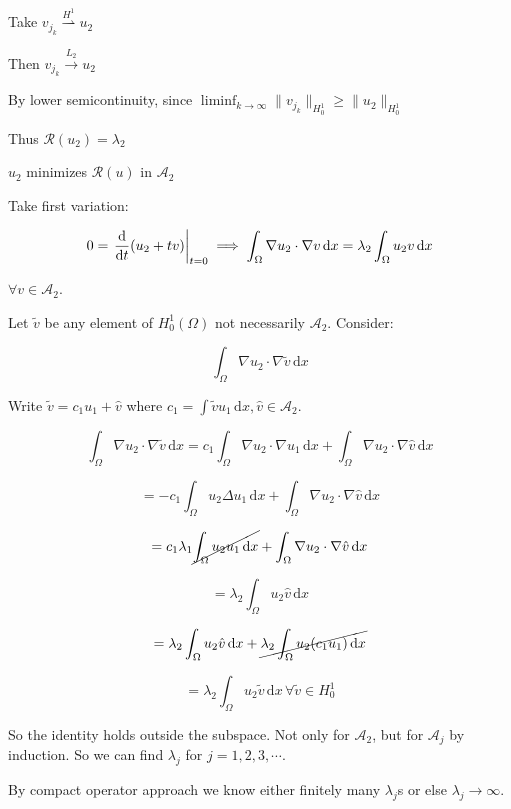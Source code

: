 \documentclass{article}
\theoremstyle{definition}
\begin{document}
Take \(v_{j_k} \overset{H^1}{\rightharpoonup} u_2\)

Then \(v_{j_k} \overset{L_2}{\to} u_2 \)

By lower semicontinuity, since \(\liminf_{k \to \infty} \lVert v_{j_k} \rVert _{H^1_0} \geq \lVert u_2 \rVert _{H^1_0}\) 

Thus \(\mathcal{R}(u_2) = \lambda_2\) 

\(u_2\) minimizes \(\mathcal{R}(u)\) in \(\mathscr{A}_2\) 

Take first variation:

\[
    0 = \eval{\frac{\mathrm{d}}{\mathrm{d}t} (u_2 + tv)}_{t=0} \implies \int_\Omega \nabla u_2 \cdot \nabla v \, \mathrm{d}x = \lambda_2 \int_{\Omega} u_2 v \,\mathrm{d}x 
\]

\(\forall v\in \mathscr{A}_2\).

Let \(\widetilde{v}\) be any element of \(H^1_0(\Omega)\) not necessarily \(\mathscr{A}_2\). Consider:

\[
    \int_{\Omega} \nabla u_2 \cdot \nabla \widetilde{v} \,\mathrm{d}x 
\]

Write \(\widetilde{v} = c_1 u_1 + \hat{v}\) where \(c_1 = \int \widetilde{v} u_1 \, \mathrm{d}x, \hat{v} \in \mathscr{A}_2\).


\[
    \int_{\Omega} \nabla u_2 \cdot \nabla \widetilde{v}  \,\mathrm{d}x = c_1 \int_{\Omega} \nabla u_2 \cdot \nabla u_1 \,\mathrm{d}x + \int_{\Omega} \nabla u_2 \cdot \nabla \hat{v} \,\mathrm{d}x 
\]

\[
    = - c_1 \int_{\Omega} u_2 \Delta u_1 \,\mathrm{d}x + \int_{\Omega} \nabla u_2 \cdot \nabla \hat{v} \,\mathrm{d}x 
\]

\[
    = c_1 \lambda_1 \cancel{\int_{\Omega} u_2 u_1 \,\mathrm{d}x} + \int_{\Omega} \nabla u_2 \cdot \nabla \hat{v} \,\mathrm{d}x 
\]

\[
    = \lambda_2 \int_{\Omega} u_2 \hat{v} \,\mathrm{d}x 
\]

\[
    = \lambda_2 \int_{\Omega} u_2 \hat{v} \,\mathrm{d}x + \cancel{\lambda_2 \int_{\Omega} u_2 (c_1 u_1) \,\mathrm{d}x }
\]

\[
    = \lambda_2 \int_{\Omega} u_2 \widetilde{v} \,\mathrm{d}x \, \forall \widetilde{v} \in H^1_0
\]

So the identity holds outside the subspace. Not only for \(\mathscr{A}_2\), but for \(\mathscr{A}_j\) by induction. So we can find \(\lambda_j\) for \(j = 1, 2, 3, \cdots\).

By compact operator approach we know either finitely many \(\lambda_j\)s or else \(\lambda_j \to \infty\).
\end{document}
